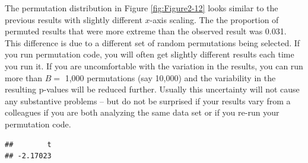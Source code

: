 \documentclass[]{book}
\newenvironment{Shaded}{\begin{snugshade}}{\end{snugshade}}
\newcommand{\KeywordTok}[1]{\textcolor[rgb]{0.13,0.29,0.53}{\textbf{#1}}}
\newcommand{\DataTypeTok}[1]{\textcolor[rgb]{0.13,0.29,0.53}{#1}}
\newcommand{\DecValTok}[1]{\textcolor[rgb]{0.00,0.00,0.81}{#1}}
\newcommand{\StringTok}[1]{\textcolor[rgb]{0.31,0.60,0.02}{#1}}
\newcommand{\OtherTok}[1]{\textcolor[rgb]{0.56,0.35,0.01}{#1}}
\newcommand{\ControlFlowTok}[1]{\textcolor[rgb]{0.13,0.29,0.53}{\textbf{#1}}}
\newcommand{\OperatorTok}[1]{\textcolor[rgb]{0.81,0.36,0.00}{\textbf{#1}}}
\newcommand{\NormalTok}[1]{#1}
\theoremstyle{definition}
\theoremstyle{definition}
\theoremstyle{remark}
\begin{document}
The permutation distribution in Figure \ref{fig:Figure2-12} looks
similar to the previous results with slightly different \(x\)-axis
scaling. The the proportion of permuted results that were more extreme
than the observed result was 0.031. This difference is due to a
different set of random permutations being selected. If you run
permutation code, you will often get slightly different results each
time you run it. If you are uncomfortable with the variation in the
results, you can run more than \(B=\) 1,000 permutations (say 10,000)
and the variability in the resulting p-values will be reduced further.
Usually this uncertainty will not cause any substantive problems -- but
do not be surprised if your results vary from a colleagues if you are
both analyzing the same data set or if you re-run your permutation code.

\begin{Shaded}
\end{Shaded}

\begin{verbatim}
##        t 
## -2.17023
\end{verbatim}

\begin{Shaded}
\end{Shaded}
\end{document}

